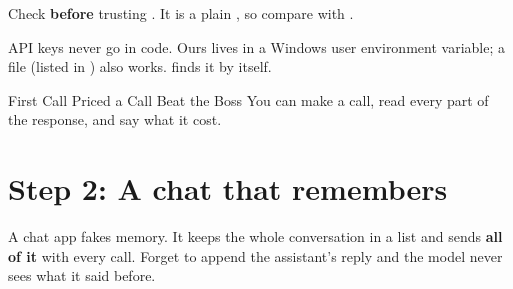 \begin{gamerule}
Check  \textbf{before} trusting . It is a plain , so compare
with \code{==}.
\end{gamerule}

\begin{trap}
API keys never go in code. Ours lives in a Windows user environment variable; a  file
(listed in ) also works.  finds it by itself.
\end{trap}

\begin{achievement}{First Call \textperiodcentered{} Priced a Call \textperiodcentered{} Beat the Boss}
You can make a call, read every part of the response, and say what it cost.
\end{achievement}

\section{Step 2: A chat that remembers}

\begin{keyidea}
A chat app fakes memory. It keeps the whole conversation in a list and sends \textbf{all of it} with
every call. Forget to append the assistant's reply and the model never sees what it said before.
\end{keyidea}

\begin{center}
\end{center}

